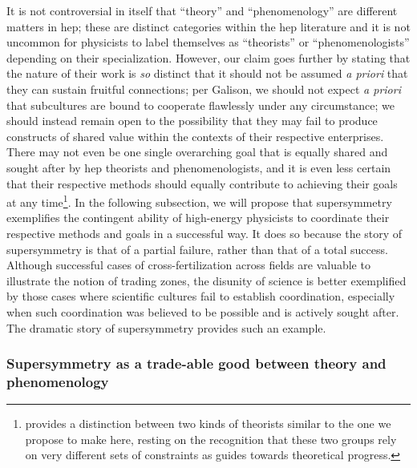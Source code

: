 \documentclass[smallextended]{svjour3}
\begin{document}
 It is not controversial in itself that ``theory'' and ``phenomenology'' are different matters in \gls{hep}; these are distinct categories within the \gls{hep} literature and it is not uncommon for physicists to label themselves as ``theorists'' or ``phenomenologists'' depending on their specialization. However, our claim goes further by stating that the nature of their work is \textit{so} distinct that it should not be assumed \textit{a priori} that they can sustain fruitful connections; per Galison, we should not expect \textit{a priori} that subcultures are bound to cooperate flawlessly under any circumstance; we should instead remain open to the possibility that they may fail to produce constructs of shared value within the contexts of their respective enterprises. There may not even be one single overarching goal that is equally shared and sought after by \gls{hep} theorists and phenomenologists, and it is even less certain that their respective methods should equally contribute to achieving their goals at any time\footnote{\citealt{Galison1995} provides a distinction between two kinds of theorists similar to the one we propose to make here, resting on the recognition that these two groups rely on very different sets of constraints as guides towards theoretical progress.}. In the following subsection, we will propose that supersymmetry exemplifies the contingent ability of high-energy physicists to coordinate their respective methods and goals in a successful way. It does so because the story of supersymmetry is that of a partial failure, rather than that of a total success. Although successful cases of cross-fertilization across fields are valuable to illustrate the notion of trading zones, the disunity of science is better exemplified by those cases where scientific cultures fail to establish coordination, especially when such coordination was believed to be possible and is actively sought after. The dramatic story of supersymmetry provides such an example.


\subsubsection{Supersymmetry as a trade-able good between theory and phenomenology}
\end{document}
